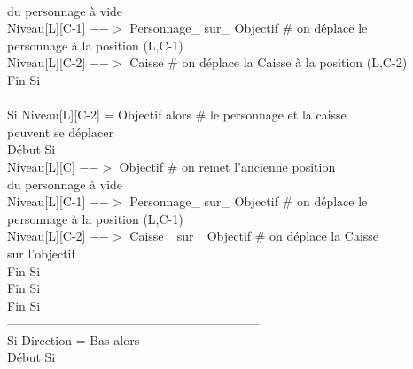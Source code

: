 \documentclass{article}
\begin{document}
\begin{tabbing}
\\ \hspace{5cm} du personnage à vide
\\	\hspace{5cm}			Niveau[L][C-1] $-->$ Personnage\_ sur\_ Objectif	\# on déplace le
\\ \hspace{5cm} personnage à la position (L,C-1)
\\	\hspace{5cm}			Niveau[L][C-2] $-->$ Caisse			\# on déplace la Caisse à la position (L,C-2)
\\	\hspace{4cm}		Fin Si
\\
\\	\hspace{4cm}		Si Niveau[L][C-2] = Objectif alors         		\# le personnage et la caisse
\\ \hspace{4cm} peuvent se déplacer
\\	\hspace{4cm}		Début Si
\\	\hspace{5cm}			Niveau[L][C] $-->$ Objectif			\# on remet l'ancienne position
\\ \hspace{5cm} du personnage à vide
\\	\hspace{5cm}			Niveau[L][C-1] $-->$ Personnage\_ sur\_ Objectif	\# on déplace le
\\ \hspace{5cm} personnage à la position (L,C-1)
\\	\hspace{5cm}			Niveau[L][C-2] $-->$ Caisse\_ sur\_ Objectif		\# on déplace la Caisse
\\ \hspace{5cm} sur l'objectif
\\	\hspace{4cm}		Fin Si
\\	\hspace{3cm}	Fin Si 
\\	\hspace{2cm}  Fin Si 
\\	--------------------------------------------------------------
\\	\hspace{2cm}  Si Direction = Bas alors
\\	\hspace{2cm}  Début Si

\end{tabbing}
\end{document}
